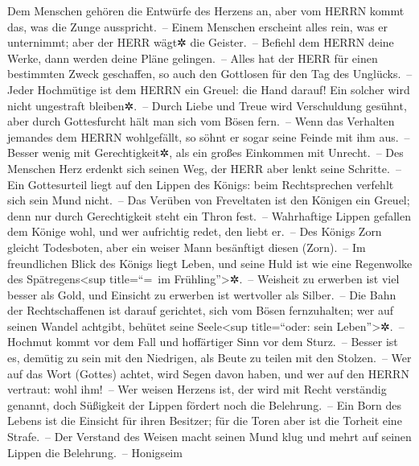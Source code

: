 Dem Menschen gehören die Entwürfe des Herzens an, aber vom
HERRN kommt das, was die Zunge ausspricht.~-- Einem
Menschen erscheint alles rein, was er unternimmt; aber der HERR wägt✲
die Geister.~-- Befiehl dem HERRN deine Werke, dann werden
deine Pläne gelingen.~-- Alles hat der HERR für einen
bestimmten Zweck geschaffen, so auch den Gottlosen für den Tag des
Unglücks.~-- Jeder Hochmütige ist dem HERRN ein Greuel:
die Hand darauf! Ein solcher wird nicht ungestraft bleiben✲.~--
Durch Liebe und Treue wird Verschuldung gesühnt, aber
durch Gottesfurcht hält man sich vom Bösen fern.~-- Wenn
das Verhalten jemandes dem HERRN wohlgefällt, so söhnt er sogar seine
Feinde mit ihm aus.~-- Besser wenig mit Gerechtigkeit✲,
als ein großes Einkommen mit Unrecht.~-- Des Menschen Herz
erdenkt sich seinen Weg, der HERR aber lenkt seine Schritte.~--
Ein Gottesurteil liegt auf den Lippen des Königs: beim
Rechtsprechen verfehlt sich sein Mund nicht.~-- 
Das Verüben von Freveltaten ist den Königen ein Greuel;
denn nur durch Gerechtigkeit steht ein Thron fest.~--
Wahrhaftige Lippen gefallen dem Könige wohl, und wer
aufrichtig redet, den liebt er.~-- Des Königs Zorn
gleicht Todesboten, aber ein weiser Mann besänftigt diesen (Zorn).~--
Im freundlichen Blick des Königs liegt Leben, und seine
Huld ist wie eine Regenwolke des Spätregens\textless sup title=``=~im
Frühling''\textgreater✲.~-- Weisheit zu erwerben ist viel
besser als Gold, und Einsicht zu erwerben ist wertvoller als Silber.~--
Die Bahn der Rechtschaffenen ist darauf gerichtet, sich
vom Bösen fernzuhalten; wer auf seinen Wandel achtgibt, behütet seine
Seele\textless sup title=``oder: sein Leben''\textgreater✲.~--
Hochmut kommt vor dem Fall und hoffärtiger Sinn vor dem
Sturz.~-- Besser ist es, demütig zu sein mit den
Niedrigen, als Beute zu teilen mit den Stolzen.~-- Wer
auf das Wort (Gottes) achtet, wird Segen davon haben, und wer auf den
HERRN vertraut: wohl ihm!~-- Wer weisen Herzens ist, der
wird mit Recht verständig genannt, doch Süßigkeit der Lippen fördert
noch die Belehrung.~-- Ein Born des Lebens ist die
Einsicht für ihren Besitzer; für die Toren aber ist die Torheit eine
Strafe.~-- Der Verstand des Weisen macht seinen Mund klug
und mehrt auf seinen Lippen die Belehrung.~-- Honigseim
